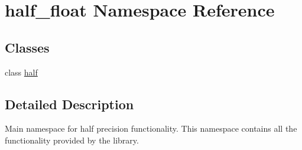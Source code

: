 \hypertarget{namespacehalf__float}{}\section{half\+\_\+float Namespace Reference}
\label{namespacehalf__float}
\subsection*{Classes}
\begin{DoxyCompactItemize}
\item 
class \hyperlink{classhalf__float_1_1half}{half}
\end{DoxyCompactItemize}


\subsection{Detailed Description}
Main namespace for half precision functionality. This namespace contains all the functionality provided by the library. 